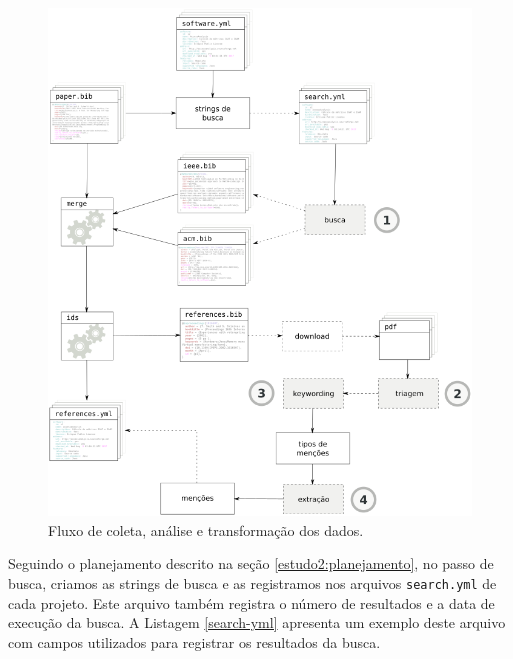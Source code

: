 \begin{figure}[h]
  \center
  \includegraphics[scale=0.35]{imagens/estudo2-fluxograma.png}
  \caption{Fluxo de coleta, análise e transformação dos dados.}
  \label{estudo2-fluxograma}
\end{figure}



Seguindo o planejamento descrito na seção \ref{estudo2:planejamento},
no passo de busca, 
criamos as strings de busca e as registramos nos arquivos \texttt{search.yml} de cada
projeto. Este arquivo também registra o número de resultados e a data de
execução da busca. A Listagem \ref{search-yml} apresenta um exemplo deste
arquivo com campos utilizados para registrar os resultados da busca.

